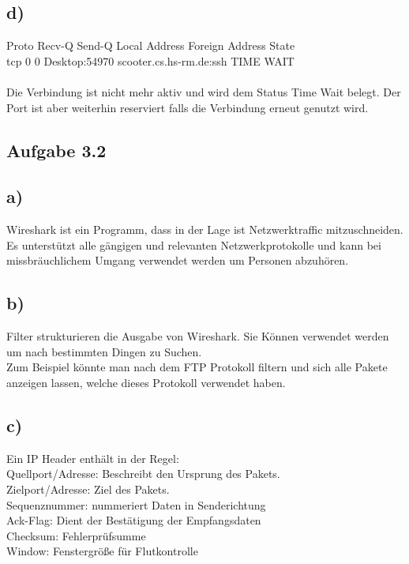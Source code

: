 \documentclass{article}
\begin{document}
	\subsection*{d)}
	Proto Recv-Q Send-Q Local Address           Foreign Address         State      \\
	tcp        0      0 Desktop:54970           scooter.cs.hs-rm.de:ssh TIME WAIT \\ \\
	Die Verbindung ist nicht mehr aktiv und wird dem Status Time Wait belegt. Der Port ist aber weiterhin reserviert falls die Verbindung erneut genutzt wird.
	\subsection*{Aufgabe 3.2}
	\subsection*{a)}
	Wireshark ist ein Programm, dass in der Lage ist Netzwerktraffic mitzuschneiden. Es unterstützt alle gängigen und relevanten Netzwerkprotokolle und kann bei missbräuchlichem Umgang verwendet werden um Personen abzuhören. \\
	
	\subsection*{b)}
	Filter strukturieren die Ausgabe von Wireshark. Sie Können verwendet werden um nach bestimmten Dingen zu Suchen. \\
	Zum Beispiel könnte man nach dem FTP Protokoll filtern und sich alle Pakete anzeigen lassen, welche dieses Protokoll verwendet haben.
	\subsection*{c)}
	Ein IP Header enthält in der Regel: \\
	Quellport/Adresse: Beschreibt den Ursprung des Pakets.\\
	Zielport/Adresse:  Ziel des Pakets. \\
	Sequenznummer: nummeriert Daten in Senderichtung \\
	Ack-Flag: Dient der Bestätigung der Empfangsdaten \\ 
	Checksum: Fehlerprüfsumme \\
	Window: Fenstergröße für Flutkontrolle \\ \\
	
\end{document}
